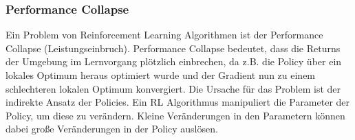 \subsubsection{Performance Collapse}
Ein Problem von Reinforcement Learning Algorithmen ist der Performance Collapse (Leistungseinbruch). Performance Collapse bedeutet, dass die Returns der Umgebung im Lernvorgang plötzlich einbrechen, da z.B. die Policy über ein lokales Optimum heraus optimiert wurde und der Gradient nun zu einem schlechteren lokalen Optimum konvergiert. Die Ursache für das Problem ist der indirekte Ansatz der Policies. Ein RL Algorithmus manipuliert die Parameter der Policy, um diese zu verändern. Kleine Veränderungen in den Parametern können dabei große Veränderungen in der Policy auslösen.


